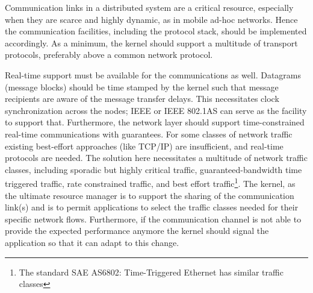Communication links in a distributed system are a critical resource,
especially when they are scarce and highly dynamic, as in mobile
ad-hoc networks. Hence the communication facilities, including the
protocol stack, should be implemented accordingly. As a minimum, the
kernel should support a multitude of transport protocols, preferably
above a common network protocol.

Real-time support must be available for the communications as
well. Datagrams (message blocks) should be time stamped by the kernel
such that message recipients are aware of the message transfer
delays. This necessitates clock synchronization across the nodes;
IEEE or IEEE 802.1AS can serve as the facility to support that. 
Furthermore, the network layer should support time-constrained
real-time communications with guarantees. For some classes of network
traffic existing best-effort approaches (like TCP/IP) are
insufficient, and real-time protocols are needed. The solution here 
necessitates a multitude of network traffic classes, including sporadic but highly critical
traffic, guaranteed-bandwidth time triggered traffic, rate constrained
traffic, and best effort traffic\footnote{\vspace{-0.05in}The standard
SAE AS6802: Time-Triggered Ethernet has similar traffic classes}. The kernel, as the ultimate 
resource manager is to support the sharing of the communication link(s) and 
is to permit applications to  select the traffic classes needed for 
their specific network flows. Furthermore, if the
communication channel is not able to provide the expected performance
anymore the kernel should signal the application so that it can adapt to this change.

